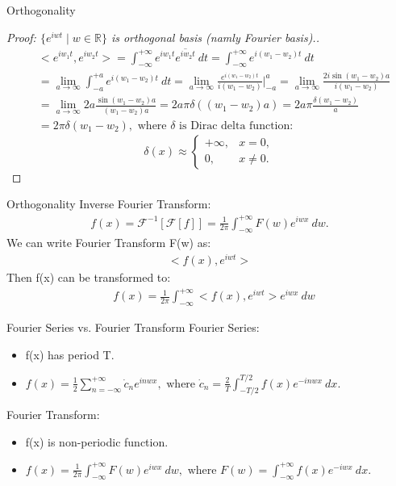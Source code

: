 \documentclass{beamer}
\begin{document}
	\begin{frame}{Orthogonality}
		\begin{proof}[Proof: $\{e^{iwt} \mid w\in\mathbb{R}\}$ is orthogonal basis (namly Fourier basis).]
			\begin{align*}
				& <e^{iw_1t}, e^{iw_2t}> = \int_{-\infty}^{+\infty}e^{iw_1t}\overline{e^{iw_2t}}\ dt = \int_{-\infty}^{+\infty}e^{i(w_1-w_2)t}\ dt \\
				& = \lim_{a \rightarrow \infty} \int_{-a}^{+a}e^{i(w_1-w_2)t}\ dt = \lim_{a \rightarrow \infty} \frac{e^{i(w_1-w_2)t}}{i(w_1-w_2)} \biggr \rvert_{-a}^{a} = \lim_{a \rightarrow \infty} \frac{2i\sin (w_1-w_2)a}{i(w_1-w_2)} \\
				& = \lim_{a \rightarrow \infty} 2a \frac{\sin (w_1-w_2)a}{(w_1-w_2)a} = 2a\pi \delta((w_1-w_2)a) = 2a\pi\frac{\delta(w_1-w_2)}{a} \\
				& = 2\pi\delta(w_1-w_2), \text{ where }\delta\text{ is Dirac delta function:}
			\end{align*}	
			\begin{equation*}
				\delta(x) \approx 
				\begin{cases}
					+\infty, &x=0,\\
					0, &x\neq 0.
				\end{cases}
			\end{equation*}
		\end{proof}
	\end{frame}
	\begin{frame}{Orthogonality}
		Inverse Fourier Transform:
		\begin{align*}
			f(x) = \mathcal{F}^{-1}[\mathcal{F}[f]] = \frac{1}{2\pi}\int_{-\infty}^{+\infty}F(w)e^{iwx}\ dw.
		\end{align*}
		We can write Fourier Transform F(w) as:
		\begin{align*}
			<f(x), e^{iwt}>
		\end{align*}
		Then f(x) can be transformed to:
		\begin{align*}
			&f(x) = \frac{1}{2\pi}\int_{-\infty}^{+\infty}<f(x), e^{iwt}>e^{iwx}\ dw
		\end{align*}
	\end{frame}
	\begin{frame}{Fourier Series vs. Fourier Transform}
		Fourier Series:
		\begin{itemize}
			\item f(x) has period T.
			\item $f(x) = \frac{1}{2}\sum_{n=-\infty}^{+\infty}\dot{c}_ne^{inwx}, \text{ where }\dot{c}_n = \frac{2}{T}\int_{-T/2}^{T/2}f(x)e^{-inwx}\ dx.$
		\end{itemize}
		Fourier Transform:
		\begin{itemize}
			\item f(x) is non-periodic function.
			\item $f(x) = \frac{1}{2\pi}\int_{-\infty}^{+\infty}F(w)e^{iwx}\ dw, \text{ where } F(w) = \int_{-\infty}^{+\infty}f(x)e^{-iwx}\ dx.$
		\end{itemize}
	\end{frame}
\end{document}
